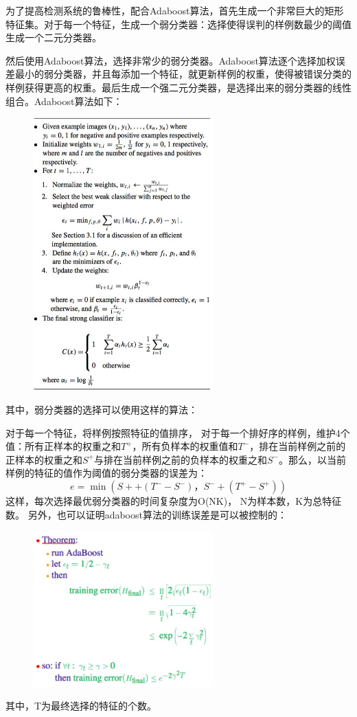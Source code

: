 为了提高检测系统的鲁棒性，配合Adaboost算法，首先生成一个非常巨大的矩形特征集。对于每一个特征，生成一个弱分类器：选择使得误判的样例数最少的阈值生成一个二元分类器。


然后使用Adaboost算法，选择非常少的弱分类器。Adaboost算法逐个选择加权误差最小的弱分类器，并且每添加一个特征，就更新样例的权重，使得被错误分类的样例获得更高的权重。最后生成一个强二元分类器，是选择出来的弱分类器的线性组合。Adaboost算法如下：
\begin{figure}[H]
    \centering 
    \includegraphics[width=0.618\textwidth]{image/2_1_1_2.jpg}    
    \label{logic}
\end{figure}
其中，弱分类器的选择可以使用这样的算法：

对于每一个特征，将样例按照特征的值排序，
对于每一个排好序的样例，维护4个值：所有正样本的权重之和$T^+$，所有负样本的权重值和$T^-$，排在当前样例之前的正样本的权重之和$S^+$与排在当前样例之前的负样本的权重之和$S^-$。那么，以当前样例的特征的值作为阈值的弱分类器的误差为：
$$e = \min(S+ + (T^- - S^-)， S^-  + ( T^+ - S^+))$$
这样，每次选择最优弱分类器的时间复杂度为O(NK)， N为样本数，K为总特征数。
另外，也可以证明adaboost算法的训练误差是可以被控制的：
\begin{figure}[H]
    \centering 
    \includegraphics[width=0.618\textwidth]{image/2_1_1_3.jpg}    
    \label{logic}
\end{figure}
其中，T为最终选择的特征的个数。

